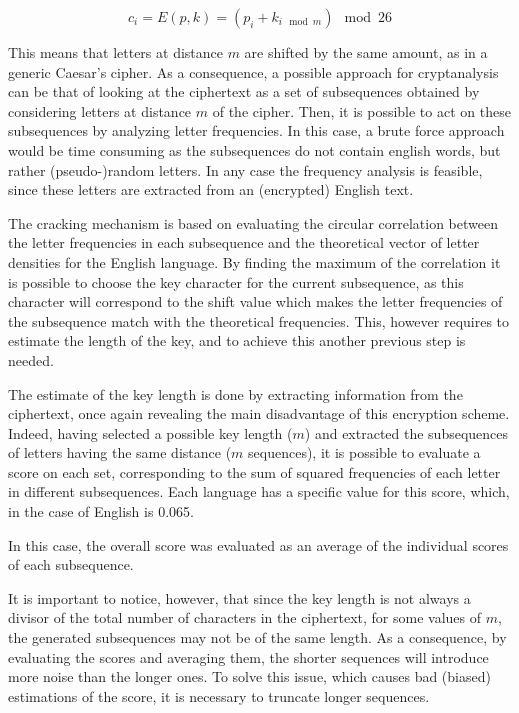 \documentclass[12pt]{article}
\begin{document}
\begin{equation}
  c_i = E(p,k) = (p_i + k_{i\mod{m}})\mod{26}
\end{equation}

This means that letters at distance $m$ are shifted by the same amount, as in a generic Caesar's cipher.
As a consequence, a possible approach for cryptanalysis can be that of looking at the ciphertext as a set of subsequences obtained by considering letters at distance $m$ of the cipher. 
Then, it is possible to act on these subsequences by analyzing letter frequencies. In this case, a brute force approach would be time consuming as the subsequences do not contain english words, but rather (pseudo-)random letters. 
In any case the frequency analysis is feasible, since these letters are extracted from an (encrypted) English text.

The cracking mechanism is based on evaluating the circular correlation between the letter frequencies in each subsequence and the theoretical vector of letter densities for the English language. 
By finding the maximum of the correlation it is possible to choose the key character for the current subsequence, as this character will correspond to the shift value which makes the letter frequencies of the subsequence match with the theoretical frequencies.
This, however requires to estimate the length of the key, and to achieve this another previous step is needed.

The estimate of the key length is done by extracting information from the ciphertext, once again revealing the main disadvantage of this encryption scheme.
Indeed, having selected a possible key length ($m$) and extracted the subsequences of letters having the same distance ($m$ sequences), it is possible to evaluate a score on each set, corresponding to the sum of squared frequencies of each letter in different subsequences.
Each language has a specific value for this score, which, in the case of English is 0.065.

In this case, the overall score was evaluated as an average of the individual scores of each subsequence.

It is important to notice, however, that since the key length is not always a divisor of the total number of characters in the ciphertext, for some values of $m$, the generated subsequences may not be of the same length. As a consequence, by evaluating the scores and averaging them, the shorter sequences will introduce more noise than the longer ones. To solve this issue, which causes bad (biased) estimations of the score, it is necessary to truncate longer sequences.
\end{document}
